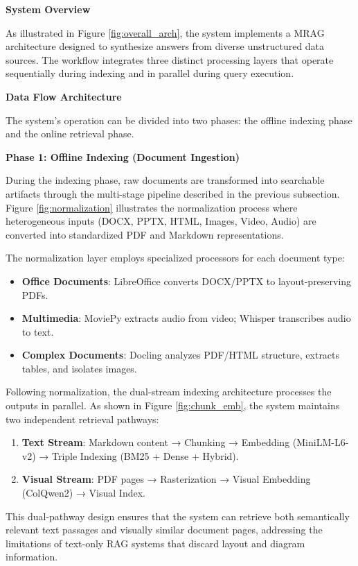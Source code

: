 \textbf{System Overview}

As illustrated in Figure \ref{fig:overall_arch}, the system implements a MRAG architecture designed to synthesize answers from diverse unstructured data sources. The workflow integrates three distinct processing layers that operate sequentially during indexing and in parallel during query execution.

\textbf{Data Flow Architecture}

The system's operation can be divided into two phases: the offline indexing phase and the online retrieval phase.

\textbf{Phase 1: Offline Indexing (Document Ingestion)}

During the indexing phase, raw documents are transformed into searchable artifacts through the multi-stage pipeline described in the previous subsection. Figure \ref{fig:normalization} illustrates the normalization process where heterogeneous inputs (DOCX, PPTX, HTML, Images, Video, Audio) are converted into standardized PDF and Markdown representations.

The normalization layer employs specialized processors for each document type:
\begin{itemize}
    \item \textbf{Office Documents}: LibreOffice converts DOCX/PPTX to layout-preserving PDFs.
    \item \textbf{Multimedia}: MoviePy extracts audio from video; Whisper transcribes audio to text.
    \item \textbf{Complex Documents}: Docling analyzes PDF/HTML structure, extracts tables, and isolates images.
\end{itemize}

Following normalization, the dual-stream indexing architecture processes the outputs in parallel. As shown in Figure \ref{fig:chunk_emb}, the system maintains two independent retrieval pathways:

\begin{enumerate}
    \item \textbf{Text Stream}: Markdown content → Chunking → Embedding (MiniLM-L6-v2) → Triple Indexing (BM25 + Dense + Hybrid).
    \item \textbf{Visual Stream}: PDF pages → Rasterization → Visual Embedding (ColQwen2) → Visual Index.
\end{enumerate}

This dual-pathway design ensures that the system can retrieve both semantically relevant text passages and visually similar document pages, addressing the limitations of text-only RAG systems that discard layout and diagram information.

